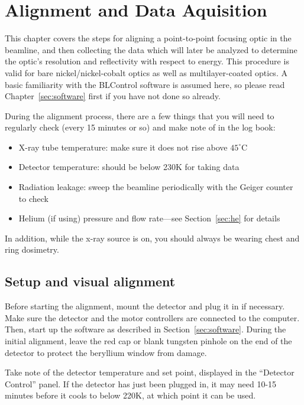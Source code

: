 \chapter{Alignment and Data Aquisition}

This chapter covers the steps for aligning a point-to-point focusing optic in the beamline, and then collecting the data which will later be analyzed to determine the optic's resolution and reflectivity with respect to energy. This procedure is valid for bare nickel/nickel-cobalt optics as well as multilayer-coated optics. A basic familiarity with the BLControl software is assumed here, so please read Chapter~\ref{sec:software} first if you have not done so already.

During the alignment process, there are a few things that you will need to regularly check (every 15 minutes or so) and make note of in the log book:

\begin{itemize}

\item X-ray tube temperature: make sure it does not rise above $45^\circ$C
\item Detector temperature: should be below 230K for taking data
\item Radiation leakage: sweep the beamline periodically with the Geiger counter to check
\item Helium (if using) pressure and flow rate---see Section~\ref{sec:he} for details

\end{itemize}
In addition, while the x-ray source is on, you should always be wearing chest and ring dosimetry.

\section{Setup and visual alignment}

Before starting the alignment, mount the detector and plug it in if necessary. Make sure the detector and the motor controllers are connected to the computer. Then, start up the software as described in Section~\ref{sec:software}. During the initial alignment, leave the red cap or blank tungsten pinhole on the end of the detector to protect the beryllium window from damage.

Take note of the detector temperature and set point, displayed in the ``Detector Control'' panel. If the detector has just been plugged in, it may need 10-15 minutes before it cools to below 220K, at which point it can be used.


